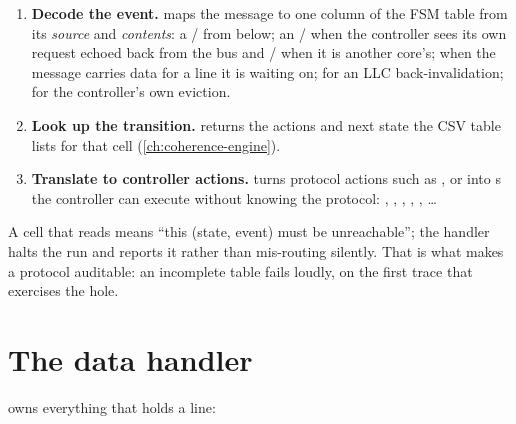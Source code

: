\begin{enumerate}
\item \textbf{Decode the event.}  maps the message to one column of the FSM
  table from its \emph{source} and \emph{contents}: a / from below; an
  / when the controller sees its own request echoed back from the
  bus and / when it is another core's;  when the
  message carries data for a line it is waiting on;  for an LLC
  back-invalidation;  for the controller's own eviction.
\item \textbf{Look up the transition.}  returns the
  actions and next state the CSV table lists for that cell (\cref{ch:coherence-engine}).
\item \textbf{Translate to controller actions.}  turns protocol actions such
  as ,  or  into s the controller
  can execute without knowing the protocol: , ,
  , , , \ldots
\end{enumerate}

A cell that reads  means ``this (state, event) must be unreachable''; the handler
halts the run and reports it rather than mis-routing silently. That is what makes a protocol
auditable: an incomplete table fails loudly, on the first trace that exercises the hole.

\section{The data handler}

 owns everything that holds a line:


